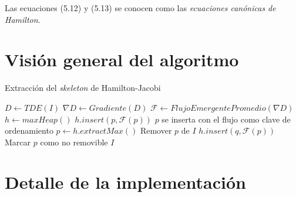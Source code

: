 \noindent
Las ecuaciones (5.12) y (5.13) se conocen como las \textit{ecuaciones canónicas de Hamilton}. 

\subsection{}

\section{Visión general del algoritmo}

\begin{algorithm}[H]
\caption{Extracción del \textit{skeleton} de Hamilton-Jacobi}
\label{alg:hjskel}
\begin{algorithmic}[1]
	\State $D \gets TDE(I)$
    \State $\nabla D \gets Gradiente(D)$
    \State $\mathcal{F} \gets FlujoEmergentePromedio(\nabla D)$
    \State $h \gets maxHeap()$
        	\State $h.insert(p, \mathcal{F}(p))$ \Comment $p$ se inserta con el flujo como clave de ordenamiento
        \EndIf
    \EndFor
    	\State $p \gets h.extractMax()$
            	\State Remover $p$ de $I$
                    	\State $h.insert(q, \mathcal{F}(p))$
                    \EndIf
                \EndFor
            \Else
            	\State Marcar $p$ como no removible
            \EndIf
        \EndIf
    \EndWhile
    \State \Return $I$
\EndFunction
\end{algorithmic}
\end{algorithm}

\section{Detalle de la implementación}

